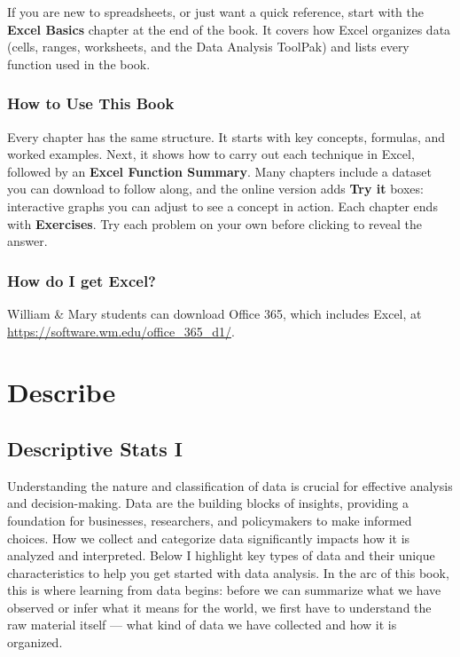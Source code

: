 \documentclass[
  11pt,
  letterpaper,
  DIV=11,
  numbers=noendperiod,
  oneside,
  open=any]{scrreprt}
\begin{document}
If you are new to spreadsheets, or just want a quick reference, start
with the \textbf{Excel Basics} chapter at the end of the book. It covers
how Excel organizes data (cells, ranges, worksheets, and the Data
Analysis ToolPak) and lists every function used in the book.

\section*{How to Use This Book}\label{how-to-use-this-book}


Every chapter has the same structure. It starts with key concepts,
formulas, and worked examples. Next, it shows how to carry out each
technique in Excel, followed by an \textbf{Excel Function Summary}. Many
chapters include a dataset you can download to follow along, and the
online version adds \textbf{Try it} boxes: interactive graphs you can
adjust to see a concept in action. Each chapter ends with
\textbf{Exercises}. Try each problem on your own before clicking to
reveal the answer.

\section*{How do I get Excel?}\label{how-do-i-get-excel}


William \& Mary students can download Office 365, which includes Excel,
at \url{https://software.wm.edu/office_365_d1/}.

\part{Describe}

\chapter{Descriptive Stats I}\label{descriptive-stats-i}

Understanding the nature and classification of data is crucial for
effective analysis and decision-making. Data are the building blocks of
insights, providing a foundation for businesses, researchers, and
policymakers to make informed choices. How we collect and categorize
data significantly impacts how it is analyzed and interpreted. Below I
highlight key types of data and their unique characteristics to help you
get started with data analysis. In the arc of this book, this is where
learning from data begins: before we can summarize what we have observed
or infer what it means for the world, we first have to understand the
raw material itself --- what kind of data we have collected and how it
is organized.
\end{document}
